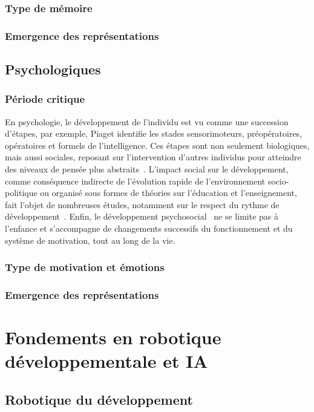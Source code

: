 \subsubsection{Type de mémoire}

\subsubsection{Emergence des représentations}

\subsection{Psychologiques}

\subsubsection{Période critique}
En psychologie, le développement de l'individu est vu comme une succession d'étapes, par exemple, Piaget identifie les stades sensorimoteurs, préopératoires, opératoires et formels de l'intelligence. 
Ces étapes sont non seulement biologiques, mais aussi sociales, reposant sur l'intervention d'autres individus pour atteindre des niveaux de pensée plus abstraits~\cite{vygotsky1978mind}. L'impact social sur le développement, comme conséquence indirecte de l'évolution rapide de l'environnement socio-politique ou organisé sous formes de théories sur l'éducation et l'enseignement, fait l'objet de nombreuses études, notamment sur le respect du rythme de développement~\cite{kreipe1983hurried}.
Enfin, le développement psychosocial~\cite{erikson1963childhood} ne se limite pas à l'enfance et s'accompagne de changements successifs du fonctionnement et du système de motivation, tout au long de la vie.


\subsubsection{Type de motivation et émotions}
\subsubsection{Emergence des représentations}

\section{Fondements en robotique développementale et IA}

\subsection{Robotique du développement}

